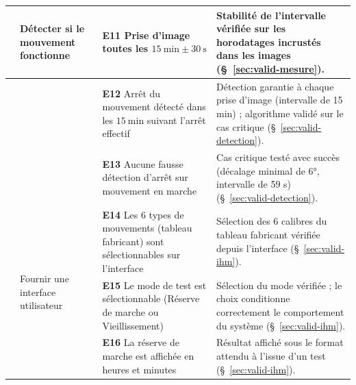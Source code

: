 \begin{landscape}
\begin{longtable}{|>{\raggedright\arraybackslash}p{1cm}|p{4cm}|p{8cm}|p{8cm}|}
\multirow{3}{*}{FS4} & \multirow{3}{4cm}{Détecter si le mouvement fonctionne}
    & \cellcolor{resConforme}\rule[-0.4\baselineskip]{0pt}{1.8\baselineskip}\textbf{E11} Prise d'image toutes les $15\ \mathrm{min} \pm 30\ \mathrm{s}$
    & \rule[-0.4\baselineskip]{0pt}{1.8\baselineskip}Stabilité de l'intervalle vérifiée sur les horodatages incrustés dans les images (§~\ref{sec:valid-mesure}). \\
\cline{3-4}
 & & \cellcolor{resConforme}\rule[-0.4\baselineskip]{0pt}{1.8\baselineskip}\textbf{E12} Arrêt du mouvement détecté dans les $15\ \mathrm{min}$ suivant l'arrêt effectif
    & \rule[-0.4\baselineskip]{0pt}{1.8\baselineskip}Détection garantie à chaque prise d'image (intervalle de 15 min) ; algorithme validé sur le cas critique (§~\ref{sec:valid-detection}). \\
\cline{3-4}
 & & \cellcolor{resConforme}\rule[-0.4\baselineskip]{0pt}{1.8\baselineskip}\textbf{E13} Aucune fausse détection d'arrêt sur mouvement en marche
    & \rule[-0.4\baselineskip]{0pt}{1.8\baselineskip}Cas critique testé avec succès (décalage minimal de 6°, intervalle de 59 s) (§~\ref{sec:valid-detection}). \\
\hline

\multirow{3}{*}{FS5} & \multirow{3}{4cm}{Fournir une interface utilisateur}
    & \cellcolor{resConforme}\rule[-0.4\baselineskip]{0pt}{1.8\baselineskip}\textbf{E14} Les 6 types de mouvements (tableau fabricant) sont sélectionnables sur l'interface
    & \rule[-0.4\baselineskip]{0pt}{1.8\baselineskip}Sélection des 6 calibres du tableau fabricant vérifiée depuis l'interface (§~\ref{sec:valid-ihm}). \\
\cline{3-4}
 & & \cellcolor{resConforme}\rule[-0.4\baselineskip]{0pt}{1.8\baselineskip}\textbf{E15} Le mode de test est sélectionnable (Réserve de marche ou Vieillissement)
    & \rule[-0.4\baselineskip]{0pt}{1.8\baselineskip}Sélection du mode vérifiée ; le choix conditionne correctement le comportement du système (§~\ref{sec:valid-ihm}). \\
\cline{3-4}
 & & \cellcolor{resConforme}\rule[-0.4\baselineskip]{0pt}{1.8\baselineskip}\textbf{E16} La réserve de marche est affichée en heures et minutes
    & \rule[-0.4\baselineskip]{0pt}{1.8\baselineskip}Résultat affiché sous le format attendu à l'issue d'un test (§~\ref{sec:valid-ihm}). \\
\hline


\end{longtable}
\end{landscape}

